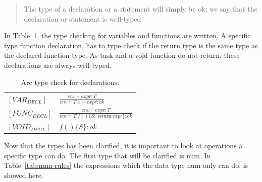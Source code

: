 \blockcquote{Huttel2010}{The type of a declaration or a statement will simply be ok; we say that the declaration or statement is well-typed}

In Table~\ref*{tab:DeclTypeCheck}, the type checking for variables and functions are written. A specific type function declaration, has to type check if the return type is the same type as the declared function type. As task and a void function do not return, these declarations are always well-typed.


\begin{table}[htb!]
    \centering
    \begin{tabular}{ll}
        \toprule
        $[VAR_{DECL}] $  & $\frac{env \vdash expr : T}{env \vdash T \;x = expr : ok}$                            \\  [12pt]
        $[FUNC_{DECL}] $ & $\frac{env \vdash expr : T}{env \vdash T \;f() \{S; \;\text{return} \; expr\}  : ok}$ \\  [12pt]
        $[VOID_{DECL}] $ & $f()\{S\}  : ok$                                                                      \\
        \bottomrule
    \end{tabular}
    \caption{Arc type check for declarations.}
    \label{tab:DeclTypeCheck}
\end{table}


Now that the types has been clarified, it is important to look at operations a specific type can do.
The first type that will be clarified is num.
In Table~\ref{tab:num-rules} the expressions which the data type num only can do, is showed here.


